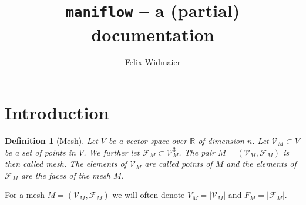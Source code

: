 \documentclass{article}
\title{\texttt{maniflow} -- a (partial) documentation}
\author{Felix Widmaier}
\date{}
\newtheorem{defi}{Definition}
\newcommand{\R}{\mathbb{R}}
\begin{document}
\maketitle
\section{Introduction}
\begin{defi}[Mesh]
    Let $V$ be a vector space  over $\R$ of dimension $n$. Let $\mathcal{V}_M\subset V$ be a set of points in $V$. We further let $\mathcal{F}_M\subset\mathcal{V}_M^3$. The pair $M = (\mathcal{V}_M, \mathcal{F}_M)$ is then called mesh. The elements of $\mathcal{V}_M$ are called points of $M$ and the elements of $\mathcal{F}_M$ are the faces of the mesh $M$.
\end{defi}
For a mesh $M = (\mathcal{V}_M, \mathcal{F}_M)$ we will often denote $V_M = \vert\mathcal{V}_M\vert$ and $F_M = \vert\mathcal{F}_M\vert$.
\end{document}

